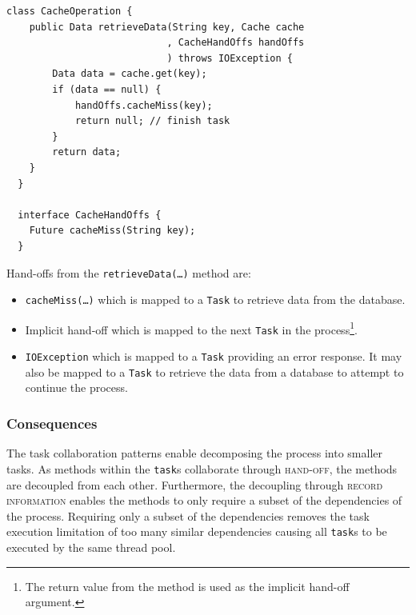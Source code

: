 \documentclass[prodmode]{style/acmlarge}
\begin{document}
\begin{lstlisting}[float,label=lst:Example_Method_Task]
  class CacheOperation {
    public Data retrieveData(String key, Cache cache
                            , CacheHandOffs handOffs
                            ) throws IOException {
        Data data = cache.get(key);
        if (data == null) {
            handOffs.cacheMiss(key);
            return null; // finish task
        }
        return data;
    }
  }

  interface CacheHandOffs {
    Future cacheMiss(String key);
  }
\end{lstlisting}

Hand-offs from the \texttt{retrieveData(\ldots)} method are:
\begin{itemize}
  \item \texttt{cacheMiss(\ldots)} which is mapped to a \texttt{Task} to retrieve data from the database.
  \item Implicit hand-off which is mapped to the next \texttt{Task} in the process\footnote{The return value from the method is used as the implicit hand-off argument.}.
  \item \texttt{IOException} which is mapped to a \texttt{Task} providing an error response.  It may also be mapped to a \texttt{Task} to retrieve the data from a database to attempt to continue the process.
\end{itemize}


\subsubsection*{Consequences}

The task collaboration patterns enable decomposing the process into smaller
tasks.  As methods within the \texttt{task}s collaborate through
\textsc{hand-off}, the methods are decoupled from each other.  Furthermore, the
decoupling through \textsc{record information} enables the methods to only
require a subset of the dependencies of the process.  Requiring only a subset of
the dependencies removes the task execution limitation of too many similar
dependencies causing all \texttt{task}s to be executed by the same thread pool.
\end{document}
